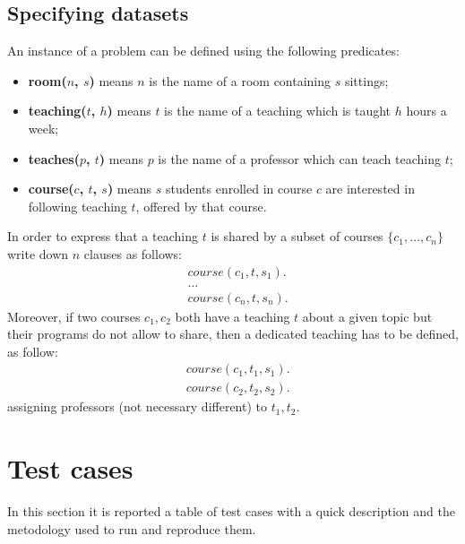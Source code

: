 \documentclass[10pt,a4paper]{article} %
\begin{document}
    \subsection{Specifying datasets}
    An instance of a problem can be defined using the following predicates:
    \begin{itemize}
        \item \textbf{room($n$, $s$)} means $n$ is the name
            of a room containing $s$ sittings;
        \item \textbf{teaching($t$, $h$)} means $t$ is the name
            of a teaching which is taught $h$ hours a week;
        \item \textbf{teaches($p$, $t$)} means $p$ is the name
            of a professor which can teach teaching $t$;
        \item \textbf{course($c$, $t$, $s$)} means $s$ students
            enrolled in course $c$ are interested in following
            teaching $t$, offered by that course.
    \end{itemize}
    In order to express that a teaching $t$ is shared by a subset of
    courses $\lbrace c_1, \ldots, c_n \rbrace$ write down $n$ clauses
    as follows:
    \begin{displaymath}
        \begin{split}
            & course(c_1, t, s_1).\\
            & \ldots \\
            & course(c_n, t, s_n).
        \end{split}
    \end{displaymath}
    Moreover, if two courses $c_1, c_2$ both have a teaching $t$ about
    a given topic but their programs do not allow to share, then
    a dedicated teaching has to be defined, as follow:
    \begin{displaymath}
        \begin{split}
            & course(c_1, t_1, s_1).\\
            & course(c_2, t_2, s_2).
        \end{split}
    \end{displaymath}
    assigning professors (not necessary different) to $t_1, t_2$.

    \section{Test cases}
    In this section it is reported a table of test cases with a
    quick description and the metodology used to run and reproduce them.
\end{document}
